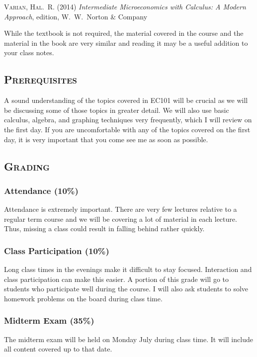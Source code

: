 \documentclass[10pt]{article}
\begin{document}
\medskip
\textsc{Varian, Hal.~R.} (2014) \emph{Intermediate Microeconomics with Calculus: A Modern Approach},  edition, W.~W.~Norton \& Company
\medskip

\noindent While the textbook is not required, the material covered in the course and the material in the book are very similar and reading it may be a useful addition to your class notes.

\subsection*{\textsc{Prerequisites}}
A sound understanding of the topics covered in EC101 will be crucial as we will be discussing some of those topics in greater detail. We will also use basic calculus, algebra, and graphing techniques very frequently, which I will review on the first day. If you are uncomfortable with any of the topics covered on the first day, it is very important that you come see me as soon as possible.

\subsection*{\textsc{Grading}}
\subsubsection*{Attendance (10\%)}
Attendance is extremely important. There are very few lectures relative to a regular term course and we will be covering a lot of material in each lecture. Thus, missing a class could result in falling behind rather quickly.

\subsubsection*{Class Participation (10\%)}
Long class times in the evenings make it difficult to stay focused. Interaction and class participation can make this easier. A portion of this grade will go to students who participate well during the course. I will also ask students to solve homework problems on the board during class time.

\subsubsection*{Midterm Exam (35\%)}
The midterm exam will be held on Monday July  during class time. It will include all content covered up to that date.
\end{document}
